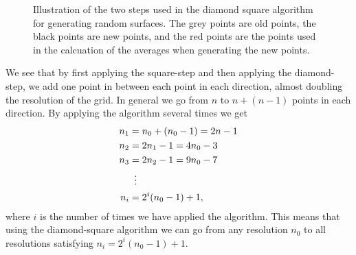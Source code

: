 \begin{figure}
\centering

\setlength{\myfigwidth}{0.5\textwidth}
\setlength{\mycaptionwidth}{0.3\textwidth}

\begin{minipage}[c]{\myfigwidth}
    
\end{minipage}
\begin{minipage}[c]{\mycaptionwidth}
    \label{fig:simple_square_step}
\end{minipage}

\begin{minipage}[c]{\myfigwidth}
    
\end{minipage}
\begin{minipage}[c]{\mycaptionwidth}
    \label{fig:simple_diamond_step}
\end{minipage}

\caption{Illustration of the two steps used in the diamond square algorithm for generating random surfaces. The grey points are old points, the black points are new points, and the red points are the points used in the calcuation of the averages when generating the new points.}
\label{fig:diamond_square_steps}
\end{figure}

We see that by first applying the square-step and then applying the diamond-step, we add one point in between each point in each direction, almost doubling the resolution of the grid. In general we go from $n$ to $n + (n-1)$ points in each direction. By applying the algorithm several times we get 
\begin{align}
    n_1 &= n_0 + (n_0-1) = 2n - 1 \nonumber\\
    n_2 &= 2n_1 - 1 = 4n_0 - 3 \nonumber\\
    n_3 &= 2n_2 - 1 = 9n_0 - 7 \nonumber\\
    &\vdotswithin{=} \nonumber\\
    n_i &= 2^i(n_0-1) + 1, \label{eq:diamond_step_resolution}
\end{align}
where $i$ is the number of times we have applied the algorithm. This means that using the diamond-square algorithm we can go from any resolution $n_0$ to all resolutions satisfying $n_i = 2^i(n_0 - 1) + 1$.


